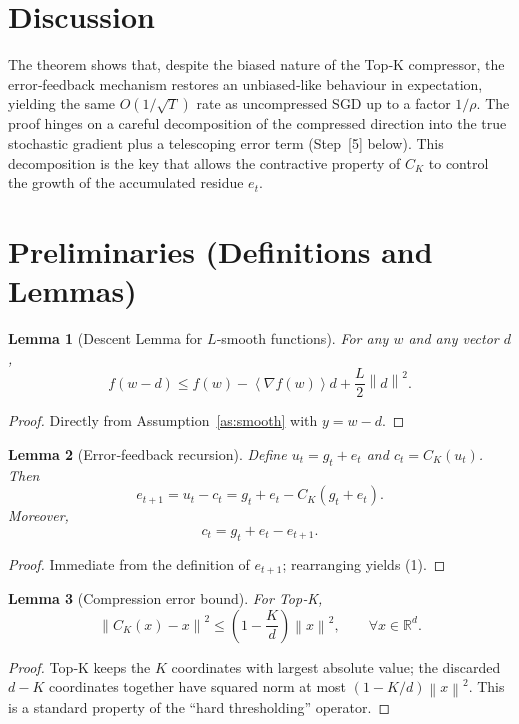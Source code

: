 \documentclass{article}
\newcommand{\RR}{\mathbb{R}}
\newcommand{\norm}[1]{\left\lVert #1 \right\rVert}
\newcommand{\inner}[1]{\left\langle #1 \right\rangle}
\newtheorem{lemma}{Lemma}
\begin{document}
\section*{Discussion}
The theorem shows that, despite the biased nature of the Top‑K compressor, the error‑feedback mechanism restores an unbiased‑like behaviour in expectation, yielding the same $O(1/\sqrt{T})$ rate as uncompressed SGD up to a factor $1/\rho$. The proof hinges on a careful decomposition of the compressed direction into the true stochastic gradient plus a telescoping error term (Step~[5] below). This decomposition is the key that allows the contractive property of $C_{K}$ to control the growth of the accumulated residue $e_t$.

\newpage

\section*{Preliminaries (Definitions and Lemmas)}

\begin{lemma}[Descent Lemma for $L$‑smooth functions]\label{lem:descent}
For any $w$ and any vector $d$,
\[
    f(w-d)\le f(w)-\inner{\nabla f(w)}{d}+\frac{L}{2}\norm{d}^{2}.
\]
\end{lemma}
\begin{proof}
Directly from Assumption~\ref{as:smooth} with $y=w-d$.
\end{proof}

\begin{lemma}[Error‑feedback recursion]\label{lem:efrec}
Define $u_t=g_t+e_t$ and $c_t=C_{K}(u_t)$. Then
\[
    e_{t+1}=u_t-c_t=g_t+e_t-C_{K}(g_t+e_t). 
\]
Moreover,
\[
    c_t = g_t+e_t-e_{t+1}. \tag{1}
\]
\end{lemma}
\begin{proof}
Immediate from the definition of $e_{t+1}$; rearranging yields (1).
\end{proof}

\begin{lemma}[Compression error bound]\label{lem:compress}
For Top‑K,
\[
    \norm{C_{K}(x)-x}^{2}\le\left(1-\frac{K}{d}\right)\norm{x}^{2},\qquad\forall x\in\RR^{d}.
\]
\end{lemma}
\begin{proof}
Top‑K keeps the $K$ coordinates with largest absolute value; the discarded $d-K$ coordinates together have squared norm at most $(1-K/d)\norm{x}^{2}$. This is a standard property of the ``hard thresholding'' operator.
\end{proof}
\end{document}
